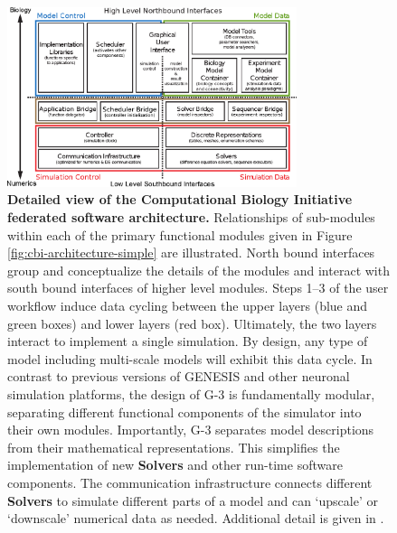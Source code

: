 \documentclass{article}
\begin{document}
\begin{figure}[h!t]
  \begin{center}
    \includegraphics[width=3.33in]{figures/cbi-architecture-expanded.eps}
  \end{center}
  \caption{ {\bf Detailed view of the Computational Biology Initiative
      federated software architecture.} Relationships of sub-modules
    within each of the primary functional modules given in Figure
    \ref{fig:cbi-architecture-simple} are illustrated.  North bound interfaces group
    and conceptualize the details of the modules and interact with
    south bound interfaces of higher level modules.  Steps 1--3 of the
    user workflow induce data cycling between the
    upper layers (blue and green boxes) and lower layers (red box).
    Ultimately, the two layers interact to implement a single simulation.
    By design, any type of model including multi-scale models will
    exhibit this data cycle. In contrast to previous versions of GENESIS and
    other neuronal simulation platforms, the design of G-3 is
    fundamentally modular, separating different functional components
    of the simulator into their own modules. Importantly, G-3
    separates model descriptions from their mathematical representations.  This simplifies the
    implementation of new {\bf Solvers} and other run-time software
    components. The communication infrastructure connects different
    {\bf Solvers} to simulate different parts of a model and can `upscale' or `downscale'
    numerical data as needed. Additional detail is given in \cite{10.1371/journal.pone.0028956}.}
  \label{fig:cbi-architecture-expanded}
\end{figure}

\end{document}
